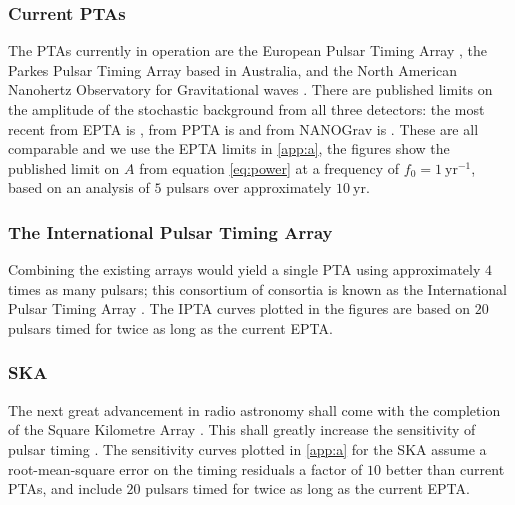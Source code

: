 \subsubsection{Current PTAs}

The PTAs currently in operation are the European Pulsar Timing Array \citep[EPTA\footnote{\url{http://www.epta.eu.org/}};][]{eptareview2013}, the Parkes Pulsar Timing Array \citep[PPTA\footnote{\url{http://www.atnf.csiro.au/research/pulsar/ppta/}};][]{parkesreview2013} based in Australia, and the North American Nanohertz Observatory for Gravitational waves \citep[NANOGrav\footnote{\url{http://nanograv.org/}};][]{nanogravreview2013}. There are published limits on the amplitude of the stochastic background from all three detectors: the most recent from EPTA is \citet{Haasteren}, from PPTA is \citet{Shannon2013} and from NANOGrav is \citet{2013ApJ...762...94D}. These are all comparable and we use the EPTA limits in \ref{app:a}, the figures show the published limit on $A$ from equation \ref{eq:power} at a frequency of $f_{0}=1~\mathrm{yr^{-1}}$, based on an analysis of $5$ pulsars over approximately $10~\mathrm{yr}$.

\subsubsection{The International Pulsar Timing Array}

Combining the existing arrays would yield a single PTA using approximately $4$ times as many pulsars; this consortium of consortia is known as the International Pulsar Timing Array \citep[IPTA\footnote{\url{http://www.ipta4gw.org/}};][]{iptareview2013}. The IPTA curves plotted in the figures are based on $20$ pulsars timed for twice as long as the current EPTA.

\subsubsection{SKA}

The next great advancement in radio astronomy shall come with the completion of the Square Kilometre Array \citep[SKA;][]{Dewdney2009}. This shall greatly increase the sensitivity of pulsar timing \citep{Kramer2004}. The sensitivity curves plotted in \ref{app:a} for the SKA assume a root-mean-square error on the timing residuals a factor of $10$ better than current PTAs, and include $20$ pulsars timed for twice as long as the current EPTA.

